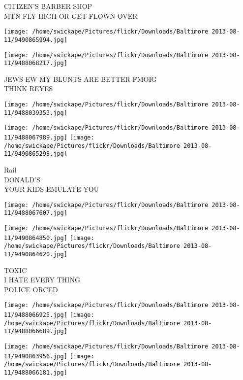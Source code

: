 \documentclass[10pt,letterpaper]{article}
\begin{document}
CITIZEN'S BARBER SHOP\\
MTN FLY HIGH OR GET FLOWN OVER\\
\pagebreak

\texttt{[image: /home/swickape/Pictures/flickr/Downloads/Baltimore 2013-08-11/9490865994.jpg]}

\vspace{0.25in}
\texttt{[image: /home/swickape/Pictures/flickr/Downloads/Baltimore 2013-08-11/9488068217.jpg]}

JEWS EW MY BLUNTS ARE BETTER FMOIG\\
THINK REYES\\
\pagebreak

\texttt{[image: /home/swickape/Pictures/flickr/Downloads/Baltimore 2013-08-11/9488039353.jpg]}

\vspace{0.25in}
\texttt{[image: /home/swickape/Pictures/flickr/Downloads/Baltimore 2013-08-11/9488067989.jpg]}
\texttt{[image: /home/swickape/Pictures/flickr/Downloads/Baltimore 2013-08-11/9490865298.jpg]}

Rail\\
DONALD'S\\
YOUR KIDS EMULATE YOU\\
\pagebreak

\texttt{[image: /home/swickape/Pictures/flickr/Downloads/Baltimore 2013-08-11/9488067607.jpg]}

\vspace{0.25in}
\texttt{[image: /home/swickape/Pictures/flickr/Downloads/Baltimore 2013-08-11/9490864850.jpg]}
\texttt{[image: /home/swickape/Pictures/flickr/Downloads/Baltimore 2013-08-11/9490864620.jpg]}

TOXIC\\
I HATE EVERY THING\\
POLICE ORCED\\
\pagebreak

\texttt{[image: /home/swickape/Pictures/flickr/Downloads/Baltimore 2013-08-11/9488066925.jpg]}
\texttt{[image: /home/swickape/Pictures/flickr/Downloads/Baltimore 2013-08-11/9488066689.jpg]}

\texttt{[image: /home/swickape/Pictures/flickr/Downloads/Baltimore 2013-08-11/9490863956.jpg]}
\texttt{[image: /home/swickape/Pictures/flickr/Downloads/Baltimore 2013-08-11/9488066181.jpg]}
\end{document}
